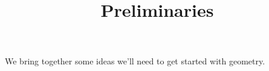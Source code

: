 \documentclass{ximera}
\title{Preliminaries}
\begin{document}
\begin{abstract}
\end{abstract}
\maketitle

We bring together some ideas we'll need to get started with geometry.
\end{document}
